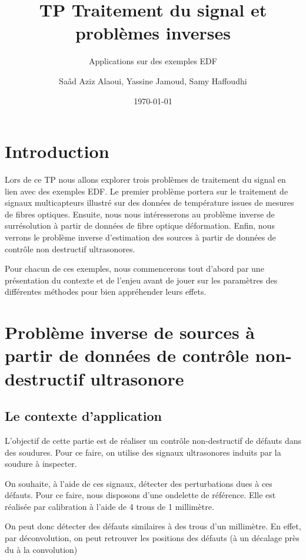 \documentclass[12pt,a4paper,titlepage]{scrartcl}
\title{TP Traitement du signal et problèmes inverses}
\subtitle{Applications sur des exemples EDF}
\author{Saâd Aziz Alaoui, Yassine Jamoud, Samy Haffoudhi}
\date{\today}
\begin{document}
\maketitle

\section*{Introduction}

Lors de ce TP nous allons explorer trois problèmes de traitement
du signal en lien avec des exemples EDF. Le premier problème portera
sur le traitement de signaux multicapteurs illustré sur des données
de température issues de mesures de fibres optiques. Ensuite, nous
nous intéresserons au problème inverse de surrésolution à partir de
données de fibre optique déformation. Enfin, nous verrons le
problème inverse d'estimation des sources à partir de données
de contrôle non destructif ultrasonores.

Pour chacun de ces exemples,
nous commencerons tout d'abord par une présentation du contexte et
de l'enjeu avant de jouer sur les paramètres des différentes méthodes
pour bien appréhender leurs effets.


\section{Problème inverse de sources à partir de données de contrôle
non-destructif ultrasonore}

\subsection{Le contexte d'application}

L'objectif de cette partie est de réaliser un contrôle non-destructif
de défauts dans des soudures. Pour ce faire, on utilise des signaux
ultrasonores induits par la soudure à inspecter.

On souhaite, à l'aide de ces signaux, détecter des perturbations dues
à ces défauts. Pour ce faire, nous disposons d'une ondelette de
référence. Elle est réalisée par calibration à l'aide de 4 trous de
1 millimètre.

On peut donc détecter des défauts similaires à des trous d'un millimètre.
En effet, par déconvolution, on peut retrouver les positions des défauts
(à un décalage près du à la convolution)
\end{document}
